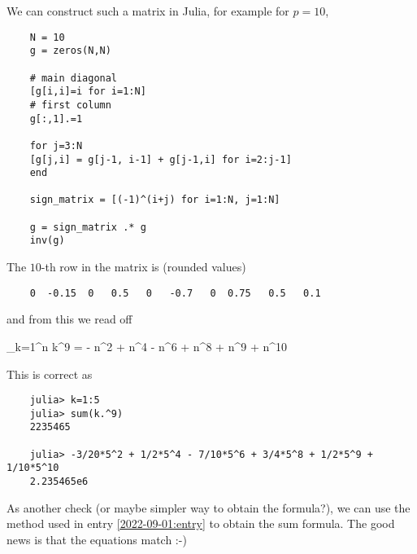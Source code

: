 We can construct such a matrix in Julia, for example for $p=10$,

\begin{verbatim}
    N = 10
    g = zeros(N,N)

    # main diagonal
    [g[i,i]=i for i=1:N]
    # first column
    g[:,1].=1

    for j=3:N
    [g[j,i] = g[j-1, i-1] + g[j-1,i] for i=2:j-1]
    end

    sign_matrix = [(-1)^(i+j) for i=1:N, j=1:N]

    g = sign_matrix .* g
    inv(g)
\end{verbatim}

The $10$-th row in the matrix is (rounded values)

\begin{verbatim}
    0  -0.15  0   0.5   0   -0.7   0  0.75   0.5   0.1
\end{verbatim}

and from this we read off

\bee
\sum_{k=1}^n k^{9} = -  n^2 +  n^4 -  n^6 +  n^8 +  n^9 +  n^{10}
\eee

This is correct as

\begin{verbatim}
    julia> k=1:5
    julia> sum(k.^9)
    2235465

    julia> -3/20*5^2 + 1/2*5^4 - 7/10*5^6 + 3/4*5^8 + 1/2*5^9 + 1/10*5^10
    2.235465e6
\end{verbatim}

As another check (or maybe simpler way to obtain the formula?), we can use the method used in entry \ref{2022-09-01:entry} to obtain the sum formula. The good news is that the equations match :-) 


